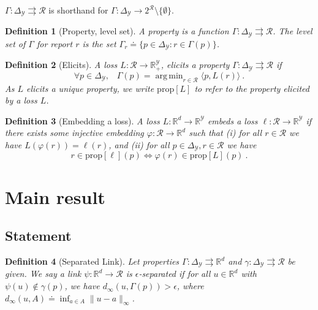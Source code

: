 \documentclass[12pt]{article}
\newcommand{\reals}{\mathbb{R}}
\newcommand{\defeq}{\doteq}%
\newcommand{\prop}[1]{\mathrm{prop}[#1]}
\newcommand{\simplex}{\Delta_\Y}
\newcommand{\R}{\mathcal{R}}
\newcommand{\Y}{\mathcal{Y}}
\newcommand{\inprod}[2]{\langle #1, #2 \rangle}%
\newcommand{\toto}{\rightrightarrows}
\DeclareMathOperator*{\argmin}{arg\,min}
\newtheorem{definition}{Definition}
\begin{document}
$\Gamma: \simplex \toto \R$ is shorthand for $\Gamma: \simplex \to 2^{\R} \setminus \{\emptyset\}$.

\begin{definition}[Property, level set]\label{def:property}
  A \emph{property} is a function $\Gamma:\simplex\toto\R$.
  The \emph{level set} of $\Gamma$ for report $r$ is the set $\Gamma_r \defeq \{p \in \simplex : r \in \Gamma(p)\}$.
\end{definition}

\begin{definition}[Elicits]
  \label{def:elicits}
  A loss $L:\R\to\reals^\Y_+$, \emph{elicits} a property $\Gamma:\simplex \toto \R$ if
  \begin{equation}
    \forall p\in\simplex,\;\;\;\Gamma(p) = \argmin_{r \in \R} \inprod{p}{L(r)}~.
  \end{equation}
  As $L$ elicits a unique property, we write $\prop{L}$ to refer to the property elicited by a loss $L$.
\end{definition}

\begin{definition}[Embedding a loss]\label{def:loss-embed}
  A loss $L:\reals^d\to\reals^\Y$ \emph{embeds} a loss $\ell:\R\to\reals^\Y$ if there exists some injective embedding $\varphi:\R\to\reals^d$ such that
  (i) for all $r\in\R$ we have $L(\varphi(r)) = \ell(r)$, and (ii) for all $p\in\simplex,r\in\R$ we have
  \begin{equation}\label{eq:embed-loss}
    r \in \prop{\ell}(p) \iff \varphi(r) \in \prop{L}(p)~.
  \end{equation}
\end{definition}
%

\section{Main result}

\subsection{Statement}

\begin{definition}[Separated Link]\label{def:sep-link}
  Let properties $\Gamma:\simplex\toto\reals^d$ and $\gamma:\simplex\toto\R$ be given.
  We say a link $\psi:\reals^d\to\R$
  is \emph{$\epsilon$-separated} if for all $u\in\reals^d$ with $\psi(u)\notin\gamma(p)$, we have $d_\infty(u,\Gamma(p)) > \epsilon$, where $d_\infty(u,A) \defeq \inf_{a\in A} \|u-a\|_\infty$.
\end{definition}
\end{document}

